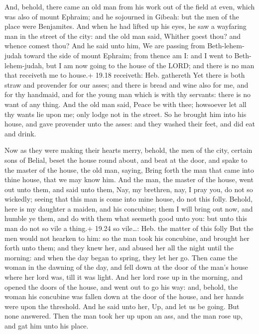  And, behold, there came an old man from his work out of
the field at even, which was also of mount Ephraim; and he sojourned in
Gibeah: but the men of the place were Benjamites.  And when
he had lifted up his eyes, he saw a wayfaring man in the street of the
city: and the old man said, Whither goest thou? and whence comest thou?
 And he said unto him, We are passing from Beth-lehem-judah
toward the side of mount Ephraim; from thence am I: and I went to
Beth-lehem-judah, but I am now going to the house of the LORD; and there
is no man that receiveth me to house.+ 19.18 receiveth: Heb. gathereth
 Yet there is both straw and provender for our asses; and
there is bread and wine also for me, and for thy handmaid, and for the
young man which is with thy servants: there is no want of any thing.
 And the old man said, Peace be with thee; howsoever let
all thy wants lie upon me; only lodge not in the street. 
So he brought him into his house, and gave provender unto the asses: and
they washed their feet, and did eat and drink.

 Now as they were making their hearts merry, behold, the
men of the city, certain sons of Belial, beset the house round about,
and beat at the door, and spake to the master of the house, the old man,
saying, Bring forth the man that came into thine house, that we may know
him.  And the man, the master of the house, went out unto
them, and said unto them, Nay, my brethren, nay, I pray you, do not so
wickedly; seeing that this man is come into mine house, do not this
folly.  Behold, here is my daughter a maiden, and his
concubine; them I will bring out now, and humble ye them, and do with
them what seemeth good unto you: but unto this man do not so vile a
thing.+ 19.24 so vile\ldots: Heb. the matter of this folly 
But the men would not hearken to him: so the man took his concubine, and
brought her forth unto them; and they knew her, and abused her all the
night until the morning: and when the day began to spring, they let her
go.  Then came the woman in the dawning of the day, and
fell down at the door of the man's house where her lord was, till it was
light.  And her lord rose up in the morning, and opened the
doors of the house, and went out to go his way: and, behold, the woman
his concubine was fallen down at the door of the house, and her hands
were upon the threshold.  And he said unto her, Up, and let
us be going. But none answered. Then the man took her up upon an ass,
and the man rose up, and gat him unto his place.

